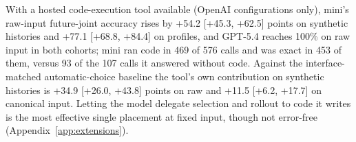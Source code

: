 With a hosted code-execution tool available (OpenAI configurations only), mini's raw-input future-joint accuracy rises by +54.2 [+45.3, +62.5] points on synthetic histories and +77.1 [+68.8, +84.4] on profiles, and GPT-5.4 reaches 100\% on raw input in both cohorts; mini ran code in 469 of 576 calls and was exact in 453 of them, versus 93 of the 107 calls it answered without code. Against the interface-matched automatic-choice baseline the tool's own contribution on synthetic histories is +34.9 [+26.0, +43.8] points on raw and +11.5 [+6.2, +17.7] on canonical input. Letting the model delegate selection and rollout to code it writes is the most effective single placement at fixed input, though not error-free (Appendix~\ref{app:extensions}).
